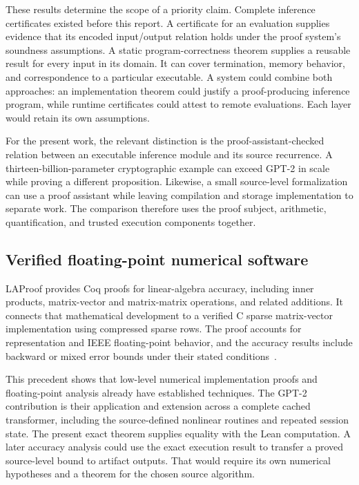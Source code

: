 These results determine the scope of a priority claim.  Complete inference certificates existed before this report.  A certificate for an evaluation supplies evidence that its encoded input/output relation holds under the proof system's soundness assumptions.  A static program-correctness theorem supplies a reusable result for every input in its domain.  It can cover termination, memory behavior, and correspondence to a particular executable.  A system could combine both approaches: an implementation theorem could justify a proof-producing inference program, while runtime certificates could attest to remote evaluations.  Each layer would retain its own assumptions.

For the present work, the relevant distinction is the proof-assistant-checked relation between an executable inference module and its source recurrence.  A thirteen-billion-parameter cryptographic example can exceed GPT-2 in scale while proving a different proposition.  Likewise, a small source-level formalization can use a proof assistant while leaving compilation and storage implementation to separate work.  The comparison therefore uses the proof subject, arithmetic, quantification, and trusted execution components together.

\subsection{Verified floating-point numerical software}

LAProof provides Coq proofs for linear-algebra accuracy, including inner products, matrix-vector and matrix-matrix operations, and related additions.  It connects that mathematical development to a verified C sparse matrix-vector implementation using compressed sparse rows.  The proof accounts for representation and IEEE floating-point behavior, and the accuracy results include backward or mixed error bounds under their stated conditions~\cite{lit-laproof}.

This precedent shows that low-level numerical implementation proofs and floating-point analysis already have established techniques.  The GPT-2 contribution is their application and extension across a complete cached transformer, including the source-defined nonlinear routines and repeated session state.  The present exact theorem supplies equality with the Lean computation.  A later accuracy analysis could use the exact execution result to transfer a proved source-level bound to artifact outputs.  That would require its own numerical hypotheses and a theorem for the chosen source algorithm.

